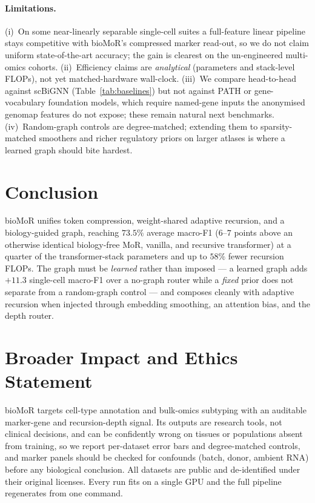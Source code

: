 \documentclass[letterpaper]{article}
\begin{document}
\paragraph{Limitations.} (i)~On some near-linearly separable single-cell suites a
full-feature linear pipeline stays competitive with bioMoR's compressed marker read-out, so
we do not claim uniform state-of-the-art accuracy; the gain is clearest on the un-engineered
multi-omics cohorts. (ii)~Efficiency claims are \emph{analytical} (parameters and
stack-level FLOPs), not yet matched-hardware wall-clock. (iii)~We compare head-to-head against
scBiGNN \cite{scbignn2023} (Table~\ref{tab:baselines}) but not against PATH \cite{howlader2026graph}
or gene-vocabulary foundation models, which require named-gene inputs the anonymised genomap features
do not expose; these remain natural next benchmarks. (iv)~Random-graph controls are degree-matched; extending
them to sparsity-matched smoothers and richer regulatory priors on larger atlases is where a
learned graph should bite hardest.

\section{Conclusion}
bioMoR unifies token compression, weight-shared adaptive recursion, and a biology-guided graph,
reaching $73.5\%$ average macro-F1 ($6$--$7$ points above an otherwise identical biology-free MoR,
vanilla, and recursive transformer) at a quarter of the transformer-stack parameters and up to
$58\%$ fewer recursion FLOPs. The graph must be \emph{learned} rather than imposed --- a learned
graph adds $+11.3$ single-cell macro-F1 over a no-graph router while a \emph{fixed} prior does not
separate from a random-graph control --- and composes cleanly with adaptive recursion when injected
through embedding smoothing, an attention bias, and the depth router.

\section{Broader Impact and Ethics Statement}
bioMoR targets cell-type annotation and bulk-omics subtyping with an auditable
marker-gene and recursion-depth signal. Its outputs are research tools, not clinical
decisions, and can be confidently wrong on tissues or populations absent from training, so
we report per-dataset error bars and degree-matched controls, and marker panels should be
checked for confounds (batch, donor, ambient RNA) before any biological conclusion. All
datasets are public and de-identified under their original licenses. Every run fits on a
single GPU and the full pipeline regenerates from one command.



\end{document}
